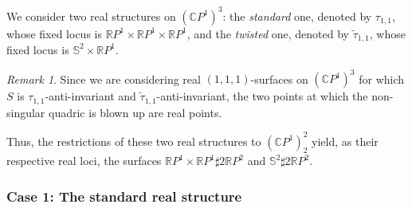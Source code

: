 \documentclass[11pt]{amsart}
\numberwithin{equation}{section}
\theoremstyle{definition}
\theoremstyle{plain}
\theoremstyle{remark}
\newtheorem{remark}[definition]{Remark}
\newcommand{\R}{\mathbb{R}}
\newcommand{\C}{\mathbb{C}}
\newcommand{\rprprp}{\mathbb{R}P^1\times \mathbb{R}P^1\times \mathbb{R}P^1}
\begin{document}
   
 We consider two real structures on $(\C P^1)^3$: the \textit{standard} one, denoted by $\tau_{1,1}$, whose fixed locus is $\rprprp$, and the \textit{twisted} one, denoted  by $\tilde{\tau}_{1,1}$, whose fixed locus is $\mathbb{S}^2\times \R P^1$.

 \begin{remark}
    Since we are considering real  $(1,1,1)$-surfaces on $(\C P^1)^3$ for which  $S$ is $\tau_{1,1}$-anti-invariant and $\tilde{\tau}_{1,1}$-anti-invariant, the two points at which the non-singular quadric is blown up are real points.
\end{remark}   

 Thus, the restrictions of these two real structures to $(\C P^1)_2^2$  yield, as their respective real loci, the surfaces
$\R P^1\times \R P^1 \sharp 2 {\R P^2}$ and $\mathbb{S}^2 \sharp 2 {\R P^2}$.

 \subsubsection*{Case 1: The standard real structure}
\end{document}
